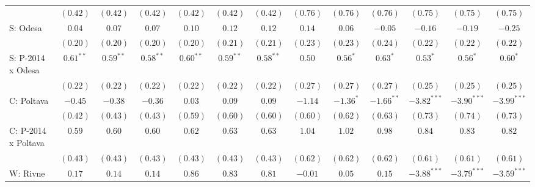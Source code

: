 \begin{table}
\begin{center}
\begin{tiny}
\begin{tabular}{l c c c c c c c c c c c c}
                            & $(0.42)$      & $(0.42)$      & $(0.42)$      & $(0.42)$     & $(0.42)$     & $(0.42)$     & $(0.76)$      & $(0.76)$     & $(0.76)$       & $(0.75)$      & $(0.75)$      & $(0.75)$      \\
S: Odesa                    & $0.04$        & $0.07$        & $0.07$        & $0.10$       & $0.12$       & $0.12$       & $0.14$        & $0.06$       & $-0.05$        & $-0.16$       & $-0.19$       & $-0.25$       \\
                            & $(0.20)$      & $(0.20)$      & $(0.20)$      & $(0.20)$     & $(0.21)$     & $(0.21)$     & $(0.23)$      & $(0.23)$     & $(0.24)$       & $(0.22)$      & $(0.22)$      & $(0.22)$      \\
S: P-2014 x Odesa           & $0.61^{**}$   & $0.59^{**}$   & $0.58^{**}$   & $0.60^{**}$  & $0.59^{**}$  & $0.58^{**}$  & $0.50$        & $0.56^{*}$   & $0.63^{*}$     & $0.53^{*}$    & $0.56^{*}$    & $0.60^{*}$    \\
                            & $(0.22)$      & $(0.22)$      & $(0.22)$      & $(0.22)$     & $(0.22)$     & $(0.22)$     & $(0.27)$      & $(0.27)$     & $(0.27)$       & $(0.25)$      & $(0.25)$      & $(0.25)$      \\
C: Poltava                  & $-0.45$       & $-0.38$       & $-0.36$       & $0.03$       & $0.09$       & $0.09$       & $-1.14$       & $-1.36^{*}$  & $-1.66^{**}$   & $-3.82^{***}$ & $-3.90^{***}$ & $-3.99^{***}$ \\
                            & $(0.42)$      & $(0.43)$      & $(0.43)$      & $(0.59)$     & $(0.60)$     & $(0.60)$     & $(0.60)$      & $(0.62)$     & $(0.63)$       & $(0.73)$      & $(0.74)$      & $(0.73)$      \\
C: P-2014 x Poltava         & $0.59$        & $0.60$        & $0.60$        & $0.62$       & $0.63$       & $0.63$       & $1.04$        & $1.02$       & $0.98$         & $0.84$        & $0.83$        & $0.82$        \\
                            & $(0.43)$      & $(0.43)$      & $(0.43)$      & $(0.43)$     & $(0.43)$     & $(0.43)$     & $(0.62)$      & $(0.62)$     & $(0.62)$       & $(0.61)$      & $(0.61)$      & $(0.61)$      \\
W: Rivne                    & $0.17$        & $0.14$        & $0.14$        & $0.86$       & $0.83$       & $0.81$       & $-0.01$       & $0.05$       & $0.15$         & $-3.88^{***}$ & $-3.79^{***}$ & $-3.59^{***}$ \\

\end{tabular}
\end{tiny}
\end{center}
\end{table}
